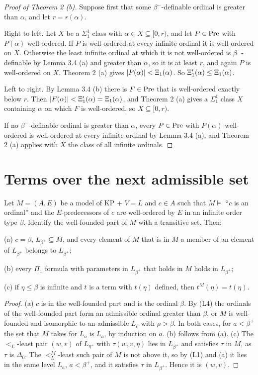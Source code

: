 \documentclass[11pt]{article}
\begin{document}
\begin{proof}[Proof of Theorem 2 (b)] Suppose first that some $\beta^-$-definable ordinal is greater than $\alpha$,
and let $r = r(\alpha)$.

Right to left. Let $X$ be a $\Sigma^1_1$ class with $\alpha \in X \subseteq [0, r)$, and let $P \in \mathrm{Pre}$ with
$P(\alpha)$ well-ordered. If $P$ is well-ordered at every infinite ordinal it is well-ordered on $X$. Otherwise the
least infinite ordinal at which it is not well-ordered is $\beta^-$-definable by Lemma 3.4 (a) and greater than
$\alpha$, so it is at least $r$, and again $P$ is well-ordered on $X$. Theorem 2 (a) gives
$|P(\alpha)| < \Xi_1(\alpha)$. So $\Xi'_1(\alpha) \le \Xi_1(\alpha)$.

Left to right. By Lemma 3.4 (b) there is $F \in \mathrm{Pre}$ that is well-ordered exactly below $r$. Then
$|F(\alpha)| < \Xi'_1(\alpha) = \Xi_1(\alpha)$, and Theorem 2 (a) gives a $\Sigma^1_1$ class $X$ containing $\alpha$ on
which $F$ is well-ordered, so $X \subseteq [0, r)$.

If no $\beta^-$-definable ordinal is greater than $\alpha$, every $P \in \mathrm{Pre}$ with $P(\alpha)$ well-ordered is
well-ordered at every infinite ordinal by Lemma 3.4 (a), and Theorem 2 (a) applies with $X$ the class of all
infinite ordinals.
\end{proof}

\section{Terms over the next admissible set}

\begin{statement} Let $M = (A, E)$ be a model of KP + $V = L$ and $c \in A$ such that
$M \models$ ``$c$ is an ordinal'' and the $E$-predecessors of $c$ are well-ordered by $E$ in an infinite order type
$\beta$. Identify the well-founded part of $M$ with a transitive set. Then:

(a) $c = \beta$, $L_{\beta^+} \subseteq M$, and every element of $M$ that is in $M$ a member of an element of
$L_{\beta^+}$ belongs to $L_{\beta^+}$;

(b) every $\Pi_1$ formula with parameters in $L_{\beta^+}$ that holds in $M$ holds in $L_{\beta^+}$;

(c) if $\eta \le \beta$ is infinite and $t$ is a term with $t(\eta)$ defined, then $t^M(\eta) = t(\eta)$.
\end{statement}

\begin{proof} (a) $c$ is in the well-founded part and is the ordinal $\beta$. By (L4) the ordinals of the
well-founded part form an admissible ordinal greater than $\beta$, or $M$ is well-founded and isomorphic to an
admissible $L_\rho$ with $\rho > \beta$. In both cases, for $a < \beta^+$ the set that $M$ takes for $L_a$ is $L_a$,
by induction on $a$. (b) follows from (a). (c) The $<_L$-least pair $(w, v)$ of $L_{\eta^+}$ with
$\tau(w, v, \eta)$ lies in $L_{\beta^+}$ and satisfies $\tau$ in $M$, as $\tau$ is $\Delta_0$. The $<_L^M$-least
such pair of $M$ is not above it, so by (L1) and (a) it lies in the same level $L_a$, $a < \beta^+$, and it
satisfies $\tau$ in $L_{\beta^+}$. Hence it is $(w, v)$.
\end{proof}
\end{document}
